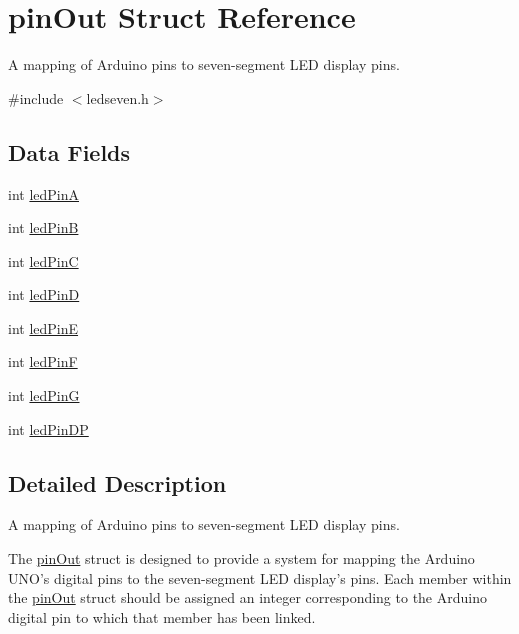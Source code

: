 \hypertarget{structpin_out}{\section{pin\+Out Struct Reference}
\label{structpin_out}
}


A mapping of Arduino pins to seven-\/segment L\+E\+D display pins.  




{\ttfamily \#include $<$ledseven.\+h$>$}

\subsection*{Data Fields}
\begin{DoxyCompactItemize}
\item 
int \hyperlink{structpin_out_a54c52aca2a7fdccb479c5a6913990e63}{led\+Pin\+A}
\item 
int \hyperlink{structpin_out_af3461f90e21457cdb1f46a3d8085ac06}{led\+Pin\+B}
\item 
int \hyperlink{structpin_out_afb9d6f76a96cc304defd23f3be3a0c9d}{led\+Pin\+C}
\item 
int \hyperlink{structpin_out_a7cf8e2fe62554d6edd30f6452a8c9a62}{led\+Pin\+D}
\item 
int \hyperlink{structpin_out_a34d7db1c42f58d60de9e5f0e10a740a2}{led\+Pin\+E}
\item 
int \hyperlink{structpin_out_a56e435d512b1ef24ca847884487314b6}{led\+Pin\+F}
\item 
int \hyperlink{structpin_out_a34bb874b0fc3ef1cf5e6956a317d18ef}{led\+Pin\+G}
\item 
int \hyperlink{structpin_out_a792d269e540bea0a98e97049975fc110}{led\+Pin\+D\+P}
\end{DoxyCompactItemize}


\subsection{Detailed Description}
A mapping of Arduino pins to seven-\/segment L\+E\+D display pins. 

The {\ttfamily \hyperlink{structpin_out}{pin\+Out}} struct is designed to provide a system for mapping the Arduino U\+N\+O's digital pins to the seven-\/segment L\+E\+D display's pins. Each member within the {\ttfamily \hyperlink{structpin_out}{pin\+Out}} struct should be assigned an integer corresponding to the Arduino digital pin to which that member has been linked.

